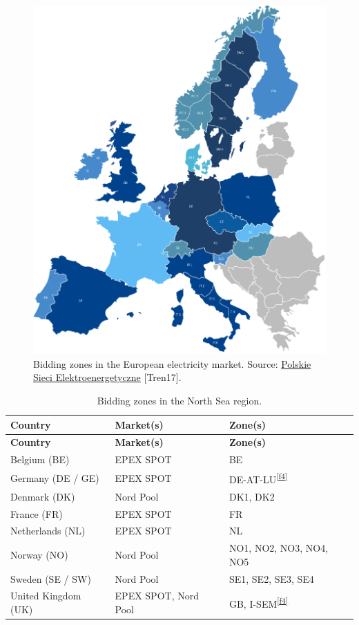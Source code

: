 \begin{figure}
\centering
\includegraphics{images/market-map.png}
\caption{Bidding zones in the European electricity market. Source:
\href{http://raport.pse.pl/en/trends-and-market-context}{Polskie Sieci
Elektroenergetyczne} {[}Tren17{]}.}
\end{figure}

\begin{longtable}[]{@{}lll@{}}
\caption{Bidding zones in the North Sea region.}\tabularnewline
\toprule
\textbf{Country} & \textbf{Market(s)} & \textbf{Zone(s)}\tabularnewline
\midrule
\endfirsthead
\toprule
\textbf{Country} & \textbf{Market(s)} & \textbf{Zone(s)}\tabularnewline
\midrule
\endhead
Belgium (BE) & EPEX SPOT & BE\tabularnewline
Germany (DE / GE) & EPEX SPOT &
DE-AT-LU\textsuperscript{\protect\hyperlink{f4}{{[}f4{]}}}\tabularnewline
Denmark (DK) & Nord Pool & DK1, DK2\tabularnewline
France (FR) & EPEX SPOT & FR\tabularnewline
Netherlands (NL) & EPEX SPOT & NL\tabularnewline
Norway (NO) & Nord Pool & NO1, NO2, NO3, NO4, NO5\tabularnewline
Sweden (SE / SW) & Nord Pool & SE1, SE2, SE3, SE4\tabularnewline
United Kingdom (UK) & EPEX SPOT, Nord Pool & GB,
I-SEM\textsuperscript{\protect\hyperlink{f4}{{[}f4{]}}}\tabularnewline
\bottomrule
\end{longtable}

